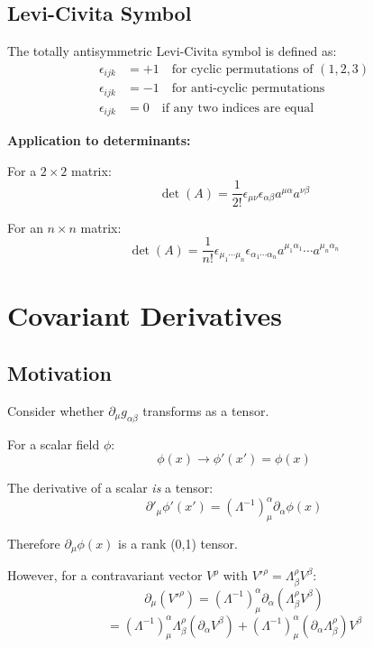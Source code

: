 \documentclass[11pt,a4paper]{article}
\begin{document}
\subsection{Levi-Civita Symbol}

The totally antisymmetric Levi-Civita symbol is defined as:
\begin{align}
\epsilon_{ijk} &= +1 \quad \text{for cyclic permutations of } (1,2,3) \\
\epsilon_{ijk} &= -1 \quad \text{for anti-cyclic permutations} \\
\epsilon_{ijk} &= 0 \quad \text{if any two indices are equal}
\end{align}

\textbf{Application to determinants:}

For a $2\times2$ matrix:
\begin{equation}
\det(A) = \frac{1}{2!} \epsilon_{\mu\nu} \epsilon_{\alpha\beta} a^{\mu\alpha} a^{\nu\beta}
\end{equation}

For an $n\times n$ matrix:
\begin{equation}
\det(A) = \frac{1}{n!} \epsilon_{\mu_1 \cdots \mu_n} \epsilon_{\alpha_1 \cdots \alpha_n} a^{\mu_1\alpha_1} \cdots a^{\mu_n\alpha_n}
\end{equation}

\section{Covariant Derivatives}

\subsection{Motivation}

Consider whether $\partial_\mu g_{\alpha\beta}$ transforms as a tensor.

For a scalar field $\phi$:
\begin{equation}
\phi(x) \to \phi'(x') = \phi(x)
\end{equation}

The derivative of a scalar \emph{is} a tensor:
\begin{equation}
\partial'_\mu \phi'(x') = (\Lambda^{-1})^\alpha_\mu \partial_\alpha \phi(x)
\end{equation}

Therefore $\partial_\mu \phi(x)$ is a rank (0,1) tensor.

However, for a contravariant vector $V^\rho$ with $V'^\rho = \Lambda^\rho_\beta V^\beta$:
\begin{equation}
\partial_\mu(V'^\rho) = (\Lambda^{-1})^\alpha_\mu \partial_\alpha(\Lambda^\rho_\beta V^\beta)
\end{equation}
\begin{equation}
= (\Lambda^{-1})^\alpha_\mu \Lambda^\rho_\beta (\partial_\alpha V^\beta) + (\Lambda^{-1})^\alpha_\mu (\partial_\alpha \Lambda^\rho_\beta) V^\beta
\end{equation}
\end{document}
